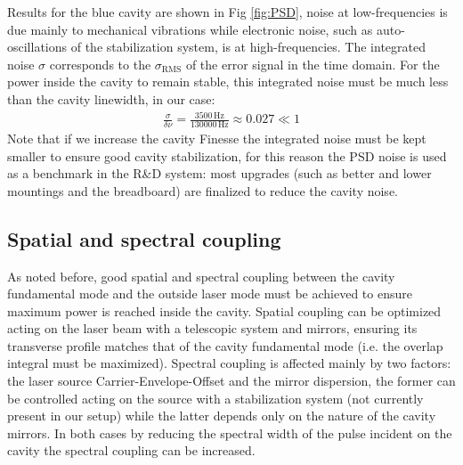 Results for the blue cavity are shown in Fig \ref{fig:PSD}, noise at low-frequencies is due mainly to mechanical vibrations while electronic noise, such as auto-oscillations of the stabilization system, is at high-frequencies. The integrated noise $\sigma$ corresponds to the $\sigma_{\mathrm{RMS}}$ of the error signal in the time domain. For the power inside the cavity to remain stable, this integrated noise must be much less than the cavity linewidth, in our case:
\begin{align}
	\frac{\sigma}{\delta\nu} = \frac{3500\,\mathrm{Hz}}{130000\,\mathrm{Hz}} \approx 0.027 \ll 1
\end{align}
Note that if we increase the cavity Finesse the integrated noise must be kept smaller to ensure good cavity stabilization, for this reason the PSD noise is used as a benchmark in the R\&D system: most upgrades (such as better and lower mountings and the breadboard) are finalized to reduce the cavity noise.

\subsection{Spatial and spectral coupling}

As noted before, good spatial and spectral coupling between the cavity fundamental mode and the outside laser mode must be achieved to ensure maximum power is reached inside the cavity. Spatial coupling can be optimized acting on the laser beam with a telescopic system and mirrors, ensuring its transverse profile matches that of the cavity fundamental mode (i.e. the overlap integral must be maximized). Spectral coupling is affected mainly by two factors: the laser source Carrier-Envelope-Offset and the mirror dispersion, the former can be controlled acting on the source with a stabilization system (not currently present in our setup) while the latter depends only on the nature of the cavity mirrors. In both cases by reducing the spectral width of the pulse incident on the cavity the spectral coupling can be increased.

